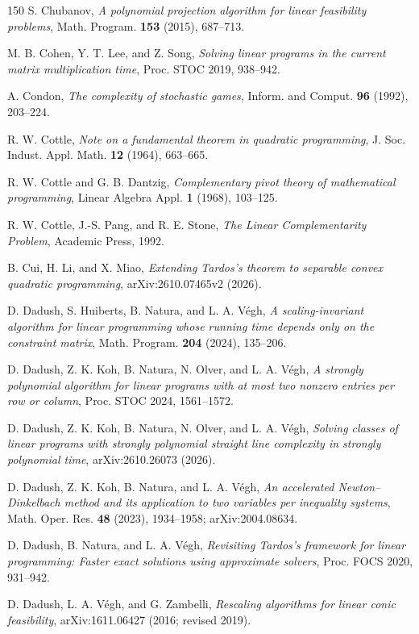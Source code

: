 \begin{thebibliography}{150}
S. Chubanov, \emph{A polynomial projection algorithm for linear feasibility problems}, Math. Program. \textbf{153} (2015), 687--713.

M. B. Cohen, Y. T. Lee, and Z. Song, \emph{Solving linear programs in the current matrix multiplication time}, Proc. STOC 2019, 938--942.

A. Condon, \emph{The complexity of stochastic games}, Inform. and Comput. \textbf{96} (1992), 203--224.

R. W. Cottle, \emph{Note on a fundamental theorem in quadratic programming}, J. Soc. Indust. Appl. Math. \textbf{12} (1964), 663--665.

R. W. Cottle and G. B. Dantzig, \emph{Complementary pivot theory of mathematical programming}, Linear Algebra Appl. \textbf{1} (1968), 103--125.

R. W. Cottle, J.-S. Pang, and R. E. Stone, \emph{The Linear Complementarity Problem}, Academic Press, 1992.

B. Cui, H. Li, and X. Miao, \emph{Extending Tardos's theorem to separable convex quadratic programming}, arXiv:2610.07465v2 (2026).

D. Dadush, S. Huiberts, B. Natura, and L. A. V\'egh, \emph{A scaling-invariant algorithm for linear programming whose running time depends only on the constraint matrix}, Math. Program. \textbf{204} (2024), 135--206.

D. Dadush, Z. K. Koh, B. Natura, N. Olver, and L. A. V\'egh, \emph{A strongly polynomial algorithm for linear programs with at most two nonzero entries per row or column}, Proc. STOC 2024, 1561--1572.

D. Dadush, Z. K. Koh, B. Natura, N. Olver, and L. A. V\'egh, \emph{Solving classes of linear programs with strongly polynomial straight line complexity in strongly polynomial time}, arXiv:2610.26073 (2026).

D. Dadush, Z. K. Koh, B. Natura, and L. A. V\'egh, \emph{An accelerated Newton--Dinkelbach method and its application to two variables per inequality systems}, Math. Oper. Res. \textbf{48} (2023), 1934--1958; arXiv:2004.08634.

D. Dadush, B. Natura, and L. A. V\'egh, \emph{Revisiting Tardos's framework for linear programming: Faster exact solutions using approximate solvers}, Proc. FOCS 2020, 931--942.

D. Dadush, L. A. V\'egh, and G. Zambelli, \emph{Rescaling algorithms for linear conic feasibility}, arXiv:1611.06427 (2016; revised 2019).


\end{thebibliography}
